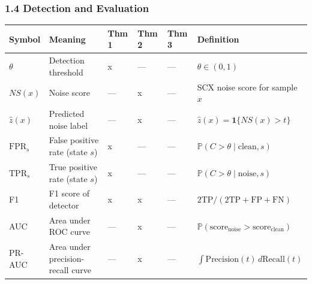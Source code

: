 \documentclass[
  12pt,
]{ctexart}
\begin{document}
\subsubsection{1.4 Detection and
Evaluation}\label{detection-and-evaluation}

\begin{longtable}[]{@{}
  >{\raggedright\arraybackslash}p{}
  >{\raggedright\arraybackslash}p{}
  >{\raggedright\arraybackslash}p{}
  >{\raggedright\arraybackslash}p{}
  >{\raggedright\arraybackslash}p{}
  >{\raggedright\arraybackslash}p{}@{}}
\toprule\noalign{}
\begin{minipage}[b]{\linewidth}\raggedright
Symbol
\end{minipage} & \begin{minipage}[b]{\linewidth}\raggedright
Meaning
\end{minipage} & \begin{minipage}[b]{\linewidth}\raggedright
Thm 1
\end{minipage} & \begin{minipage}[b]{\linewidth}\raggedright
Thm 2
\end{minipage} & \begin{minipage}[b]{\linewidth}\raggedright
Thm 3
\end{minipage} & \begin{minipage}[b]{\linewidth}\raggedright
Definition
\end{minipage} \\
\midrule\noalign{}
\endhead
\bottomrule\noalign{}
\endlastfoot
\(\theta\) & Detection threshold & x & --- & --- &
\(\theta \in (0, 1)\) \\
\(NS(x)\) & Noise score & --- & x & --- & SCX noise score for sample
\(x\) \\
\(\hat{z}(x)\) & Predicted noise label & --- & x & --- &
\(\hat{z}(x) = \mathbf{1}\{NS(x) > t\}\) \\
\(\text{FPR}_s\) & False positive rate (state \(s\)) & x & --- & --- &
\(\mathbb{P}(C > \theta \mid \text{clean}, s)\) \\
\(\text{TPR}_s\) & True positive rate (state \(s\)) & x & --- & --- &
\(\mathbb{P}(C > \theta \mid \text{noise}, s)\) \\
F1 & F1 score of detector & x & x & --- &
\(2\text{TP}/(2\text{TP}+\text{FP}+\text{FN})\) \\
AUC & Area under ROC curve & --- & x & --- &
\(\mathbb{P}(\text{score}_{\text{noise}} > \text{score}_{\text{clean}})\) \\
PR-AUC & Area under precision-recall curve & --- & x & --- &
\(\int \text{Precision}(t) \, d\text{Recall}(t)\) \\
\end{longtable}
\end{document}
